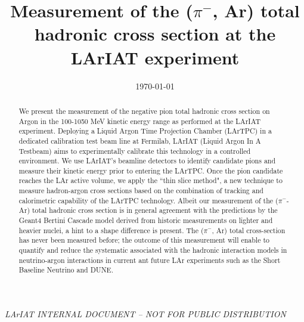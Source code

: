 \documentclass[aps,prl,twocolumn,showpacs,superscriptaddress,groupedaddress]{revtex4}  %
\begin{document}
\widetext
{}
\centerline{\em LArIAT INTERNAL DOCUMENT -- NOT FOR PUBLIC DISTRIBUTION}


\title{Measurement of the ($\pi^-$, Ar) total hadronic cross section at the LArIAT experiment}
\date{\today}


\begin{abstract}
We present the measurement of the negative pion total hadronic cross section on Argon in the 100-1050 MeV kinetic energy range as performed at the LArIAT experiment.   Deploying a Liquid Argon Time Projection Chamber (LArTPC) in a dedicated calibration test beam line at Fermilab, LArIAT (Liquid Argon In A Testbeam) aims to experimentally calibrate this technology in a controlled environment. We use LArIAT's beamline detectors to identify candidate pions and measure their kinetic energy prior to entering the LArTPC. Once the pion candidate reaches the LAr active volume, we apply the ``thin slice method", a new technique to measure hadron-argon cross sections based on the combination of tracking and calorimetric capability of the LArTPC technology. 
Albeit our measurement of the  ($\pi^-$-Ar) total hadronic cross section is in general agreement with the predictions by the Geant4 Bertini Cascade model derived from historic measurements on lighter and heavier nuclei, a hint to a shape difference is present.
The ($\pi^-$, Ar) total cross-section has never been measured before; the outcome of this measurement will enable to quantify and reduce the systematic associated with the hadronic interaction models in neutrino-argon interactions in current ant future LAr experiments such as the Short Baseline Neutrino and DUNE.
 



\end{abstract}
\end{document}
